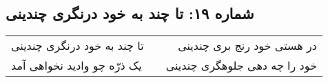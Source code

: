 \begin{center}
\section*{شماره ۱۹: تا چند به خود درنگری چندینی}
\label{sec:019}
\begin{longtable}{l p{0.5cm} r}
تا چند به خود درنگری چندینی
&&
در هستی خود رنج بری چندینی
\\
یک ذرّه چو وادید نخواهی آمد
&&
خود را چه دهی جلوهگری چندینی
\\
\end{longtable}
\end{center}

